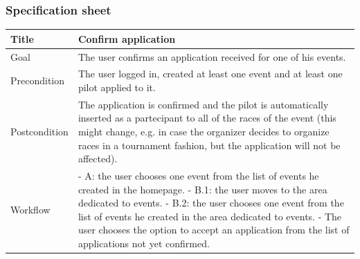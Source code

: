 \documentclass{beamer}
\begin{document}


\begin{frame}
    \frametitle{Specification sheet}
    \begin{table}
        \tiny
        \begin{tabular}{|p{2cm}|p{6cm}|}
        \hline
        Title & \textbf{Confirm application} \\
        \hline
        Goal & The user confirms an application received for one of his events. \\
        \hline
        Precondition & The user logged in, created at least one event and at least one pilot applied to it.\\
        \hline
        Postcondition & The application is confirmed and the pilot is automatically inserted as a partecipant
        to all of the races of the event (this might change, e.g. in case the organizer decides to organize races 
        in a tournament fashion, but the application will not be affected). \\
        \hline
        Workflow &
        - A: the user chooses one event from the list of events he created in the homepage. \newline
        - B.1: the user moves to the area dedicated to events. \newline
        - B.2: the user chooses one event from the list of events he created in the area dedicated to events. \newline
        - The user chooses the option to accept an application from the list of applications not yet confirmed. \\
        \hline
        \end{tabular}
\end{table}
\end{frame}
\end{document}
